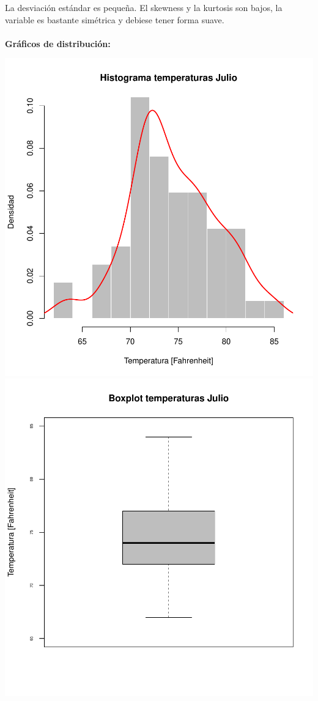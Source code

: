 \documentclass[11pt]{article}
\begin{document}
La desviación estándar es pequeña. El skewness y la kurtosis son bajos, la variable es bastante simétrica y debiese tener forma suave.
\\
\\
\textbf{Gráficos de distribución:}
\\

\begin{center}
    \includegraphics[scale = 0.3]{histtj}
    \includegraphics[scale = 0.3]{boxtj}
\end{center}
\end{document}

